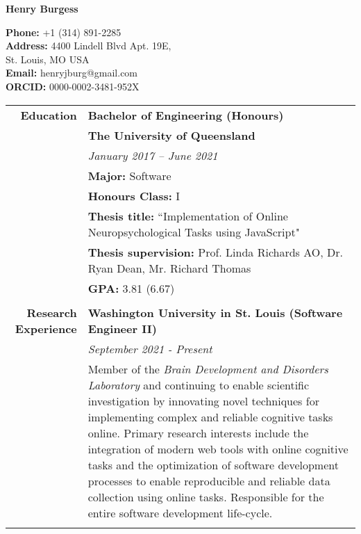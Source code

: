\documentclass{article}
\begin{document}
	\begin{minipage}{2.5in}
		\huge\textbf{Henry Burgess} 
	\end{minipage}
	\hfill
	\begin{minipage}{3in}
		\textbf{Phone:}  +1 (314) 891-2285 \\
		\hfill \textbf{Address:} 4400 Lindell Blvd Apt. 19E, \\
		St. Louis, MO USA \\
		\textbf{Email:} henryjburg@gmail.com \\
		\textbf{ORCID:} 0000-0002-3481-952X
	\end{minipage}
	\begin{longtable}{r | p{13cm}} 	
		\large\textbf{Education} 		  	& \large\textbf{Bachelor of Engineering (Honours)} \\
											& \textbf{The University of Queensland} \\
											& \textit{January 2017 – June 2021} \\
											& \textbf{Major:} Software \\
											& \textbf{Honours Class:} I \\
											& \textbf{Thesis title:} ``Implementation of Online Neuropsychological Tasks using JavaScript" \\
											& \textbf{Thesis supervision:} Prof. Linda Richards AO, Dr. Ryan Dean, Mr. Richard Thomas \\
											& \textbf{GPA:} 3.81 (6.67) \\
											& \\

		\large\textbf{Research Experience}  & \large\textbf{Washington University in St. Louis (Software Engineer II)} \\
											& \textit{September 2021 - Present} \\
											& Member of the \textit{Brain Development and Disorders Laboratory} and continuing to enable scientific investigation by innovating novel techniques for implementing complex and reliable cognitive tasks online. Primary research interests include the integration of modern web tools with online cognitive tasks and the optimization of software development processes to enable reproducible and reliable data collection using online tasks. Responsible for the entire software development life-cycle. \\ 
											& \\


\end{longtable}
\end{document}
